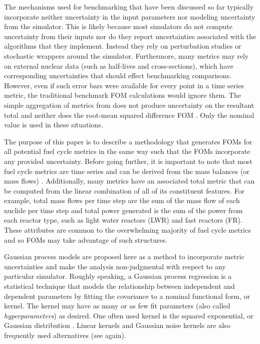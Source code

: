 The mechanisms used for benchmarking that have been discussed so far typically
incorporate neither uncertainty in the input parameters nor 
modeling uncertainty from the simulator.
This is likely because most simulators do not compute uncertainty from their
inputs nor do they report uncertainties associated with the algorithms that 
they implement. 
Instead they rely on perturbation studies or stochastic wrappers around 
the simulator. Furthermore, many metrics may rely on external nuclear 
data (such as half-lives and cross-sections), which have corresponding 
uncertainties that should effect benchmarking comparisons. 
However, even if such error bars were available for
every point in a time series metric, the traditional benchmark FOM 
calculations would ignore them. The simple aggregation of metrics from 
\cite{wigeland2014nuclear} does not produce uncertainty on the resultant
total and neither does the root-mean squared difference FOM 
\cite{mouginot2015ofcb}. Only the nominal value is used in these situations.

The purpose of this paper is to describe a methodology that generates FOMs
for all potential fuel cycle metrics in the same way such that the FOMs 
incorporate any provided uncertainty. 
Before going further, it is important to note that 
most fuel cycle 
metrics are time series and can be derived from the mass balances (or 
mass flows) \cite{wilson2011comparing,guerin2009benchmark,piet2011assessment,wigeland2014nuclear}. 
Additionally, many metrics have an associated total metric that can be 
computed from the linear combination of all of its constituent features. 
For example, total mass flows per time step are the sum of the mass flow 
of each nuclide per time step
and total power generated is the sum of the power from each reactor type, 
such as light water reactors (LWR) and fast reactors (FR). These attributes 
are common to the overwhelming majority of fuel cycle metrics and so FOMs
may take advantage of such structures.

Gaussian process models are proposed here as a method to incorporate 
metric uncertainties and make the analysis non-judgmental with respect to 
any particular
simulator. Roughly speaking, a Gaussian process regression is a 
statistical technique
that models the relationship between independent and dependent parameters
by fitting the covariance to a nominal functional form, or kernel.
The kernel may have as many or as few fit parameters (also called 
\emph{hyperparameters}) as desired. One often used kernel is the squared 
exponential, or Gaussian distribution \cite{rasmussen2006gaussian,hodlr}. 
Linear kernels and Gaussian noise kernels are also frequently used 
alternatives (see \cite{rasmussen2006gaussian,hodlr} again). 

